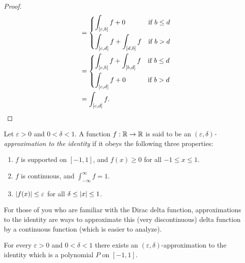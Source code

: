 \begin{proof}
\begin{align*}
                            & = \begin{dcases}
                                  \int_{[c, b]} f + 0               & \text{if } b \leq d \\
                                  \int_{[c, d]} f + \int_{[d, b]} f & \text{if } b > d
                                \end{dcases}                  \\
                            & = \begin{dcases}
                                  \int_{[c, b]} f + \int_{[b, d]} f & \text{if } b \leq d \\
                                  \int_{[c, d]} f + 0               & \text{if } b > d
                                \end{dcases}                  \\
                            & = \int_{[c, d]} f.
  \end{align*}
\end{proof}

\begin{defn}\label{3.8.6}
  Let \(\varepsilon > 0\) and \(0 < \delta < 1\).
  A function \(f : \mathbb{R} \to \mathbb{R}\) is said to be an \emph{\((\varepsilon, \delta)\)-approximation to the identity} if it obeys the following three properties:
  \begin{enumerate}
    \item \(f\) is supported on \([-1, 1]\), and \(f(x) \geq 0\) for all \(-1 \leq x \leq 1\).
    \item \(f\) is continuous, and \(\int_{-\infty}^\infty f = 1\).
    \item \(\left\lvert f(x)\right\rvert \leq \varepsilon\) for all \(\delta \leq \left\lvert x\right\rvert \leq 1\).
  \end{enumerate}
\end{defn}

\begin{rmk}\label{3.8.7}
  For those of you who are familiar with the Dirac delta function, approximations to the identity are ways to approximate this (very discontinuous) delta function by a continuous function (which is easier to analyze).
\end{rmk}

\begin{lem}\label{3.8.8}
  For every \(\varepsilon > 0\) and \(0 < \delta < 1\) there exists an \((\varepsilon, \delta)\)-approximation to the identity which is a polynomial \(P\) on \([-1, 1]\).
\end{lem}


